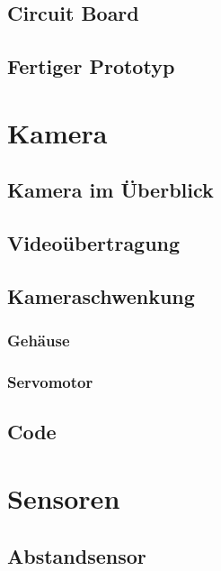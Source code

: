 \documentclass[ngerman,12pt,a4paper]{article}
\begin{document}
		\subsection{Circuit Board} %
		
		\subsection{Fertiger Prototyp} %
	
	\newpage
	\section{Kamera}
	
		\subsection{Kamera im Überblick} %
		

		
		
		
		\subsection{Videoübertragung} %
		
		\subsection{Kameraschwenkung} %
		
			\subsubsection{Gehäuse} %
			
			\subsubsection{Servomotor} %
	
		\subsection{Code} %
		
	\newpage
	\section{Sensoren}
	
		\subsection{Abstandsensor} %
\end{document}
